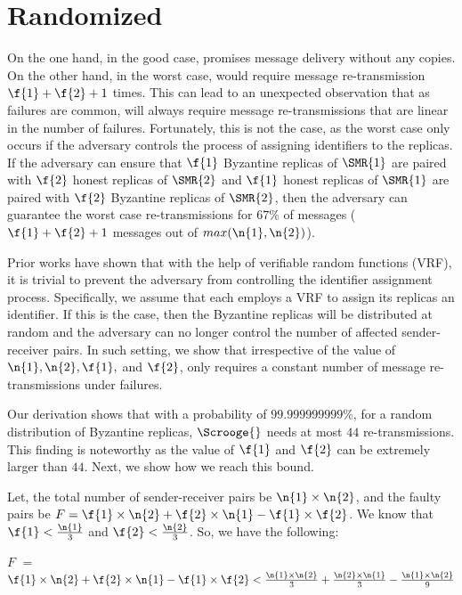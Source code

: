 \section{Randomized \Scrooge{}}
\label{s:random}
On the one hand, in the good case, \Scrooge{} promises message delivery without any copies. 
On the other hand, in the worst case, \Scrooge{} would require message re-transmission $\f{1}+\f{2}+1$ times.
This can lead to an unexpected observation that as failures are common, 
\Scrooge{} will always require message re-transmissions that are linear in the number of failures.
Fortunately, this is not the case, as the worst case only occurs if the adversary controls the process of assigning identifiers to the replicas.
If the adversary can ensure that $\f{1}$ Byzantine replicas of \RSM{} $\SMR{1}$ are paired with 
$\f{2}$ honest replicas of $\SMR{2}$ and 
$\f{1}$ honest replicas of \RSM{} $\SMR{1}$ are paired with $\f{2}$ Byzantine replicas of $\SMR{2}$,
then the adversary can guarantee the worst case re-transmissions for $67\%$ of messages
($\f{1}+\f{2}+1$ messages out of $max(\n{1},\n{2})$).

Prior works have shown that with the help of verifiable random functions (VRF), 
it is trivial to prevent the adversary from controlling the identifier assignment process.
Specifically, we assume that each \RSM{} employs a VRF to assign its replicas an identifier.
If this is the case, then the  Byzantine replicas will be distributed at random
and the adversary can no longer control the number of affected sender-receiver pairs.
In such setting, we show that irrespective of the value of $\n{1}, \n{2}, \f{1},$ and $\f{2}$, 
\Scrooge{} only requires a constant number of message re-transmissions under failures.

Our derivation shows that with a probability of $99.999999999\%$, for a random distribution of 
Byzantine replicas, $\Scrooge{}$ needs at most $44$ re-transmissions.
This finding is noteworthy as the value of $\f{1}$ and $\f{2}$ can be extremely larger than $44$.
Next, we show how we reach this bound.

Let,  the total number of sender-receiver pairs be $\n{1} \times \n{2}$, and
the faulty pairs be $F = \f{1} \times \n{2}  +  \f{2} \times\n{1} - \f{1} \times \f{2}$.
We know that $\f{1} < \frac{\n{1}}{3}$ and $\f{2} < \frac{\n{2}}{3}$. So, we have the following:

$F$ $=$ $\f{1} \times \n{2}  +  \f{2} \times\n{1} - \f{1} \times \f{2} < \frac{\n{1} \times \n{2}}{3} + \frac{\n{2}\times \n{1}}{3} - \frac{\n{1} \times \n{2}}{9}$

